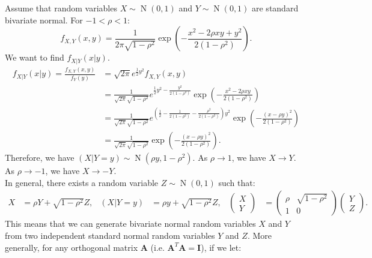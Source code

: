 \documentclass{huhtakm-template-book-v2}
\DeclareMathOperator{\N}{N}
\begin{document}
    \begin{eg}
        Assume that random variables $X \sim \N(0,1)$ and $Y \sim \N(0,1)$ are standard bivariate normal. For $-1 < \rho < 1$:
        \begin{equation*}
            f_{X,Y}(x, y) = \frac{1}{2\pi\sqrt{1-\rho^{2}}}\exp\left(-\frac{x^{2}-2\rho xy+y^{2}}{2(1-\rho^{2})}\right).
        \end{equation*}
        We want to find $f_{X|Y}(x|y)$.
        \begin{align*}
            f_{X|Y}(x|y) = \frac{f_{X,Y}(x, y)}{f_{Y}(y)} &= \sqrt{2\pi}e^{\frac{1}{2}y^{2}}f_{X,Y}(x, y)\\
            &= \frac{1}{\sqrt{2\pi}\sqrt{1-\rho^{2}}}e^{\frac{1}{2}y^{2}-\frac{y^{2}}{2(1-\rho^{2})}}\exp\left(-\frac{x^{2}-2\rho xy}{2(1-\rho^{2})}\right)\\
            &= \frac{1}{\sqrt{2\pi}{\sqrt{1-\rho^{2}}}}e^{\left(\frac{1}{2}-\frac{1}{2(1-\rho^{2})}-\frac{\rho^{2}}{2(1-\rho^{2})}\right)y^{2}}\exp\left(-\frac{(x-\rho y)^{2}}{2(1-\rho^{2})}\right)\\
            &= \frac{1}{\sqrt{2\pi}\sqrt{1-\rho^{2}}}\exp\left(-\frac{(x-\rho y)^{2}}{2(1-\rho^{2})}\right).
        \end{align*}
        Therefore, we have $(X|Y = y) \sim \N(\rho y,1-\rho^{2})$. As $\rho \to 1$, we have $X \to Y$. As $\rho \to -1$, we have $X \to -Y$.\\
        In general, there exists a random variable $Z \sim \N(0,1)$ such that:
        \begin{align*}
            X &= \rho Y+\sqrt{1-\rho^{2}}Z, & (X|Y = y) &= \rho y+\sqrt{1-\rho^{2}}Z, & \begin{pmatrix}
                X\\
                Y
            \end{pmatrix} &= \begin{pmatrix}
                \rho & \sqrt{1-\rho^{2}}\\
                1 & 0
            \end{pmatrix}\begin{pmatrix}
                Y\\
                Z
            \end{pmatrix}.
        \end{align*}
        This means that we can generate bivariate normal random variables $X$ and $Y$ from two independent standard normal random variables $Y$ and $Z$. More generally, for any orthogonal matrix $\mathbf{A}$ (i.e. $\mathbf{A}^{T}\mathbf{A} = \mathbf{I}$), if we let:

\end{eg}
\end{document}
